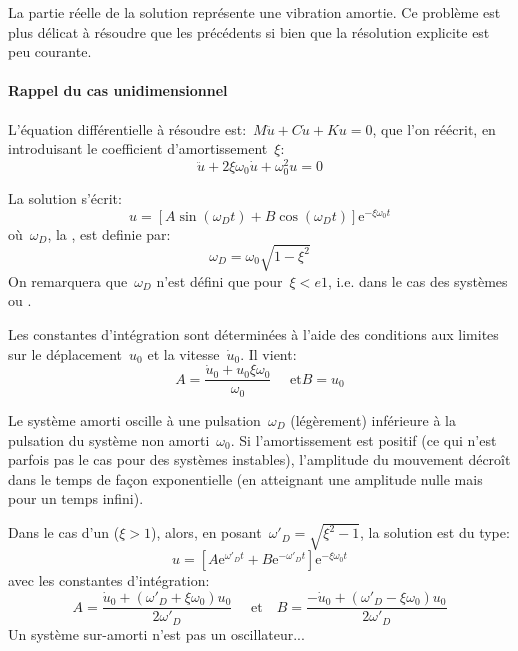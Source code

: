 La partie réelle de la solution représente une vibration amortie.
Ce problème est plus délicat à résoudre que les précédents si bien que la résolution
explicite est peu courante.

\medskip
{}
\paragraph{Rappel du cas unidimensionnel}
L'équation différentielle à résoudre est:~$M\ddot{u}+C\dot{u}+Ku=0$, que l'on
réécrit, en introduisant le coefficient d'amortissement~$\xi$:
\begin{equation}\ddot{u}+2\xi\omega_0\dot{u}+\omega^2_0 u=0\end{equation}

La solution s'écrit: \begin{equation} u=\left[A\sin (\omega_D t)+B\cos(\omega_D t)\right] \mathrm{e}^{-\xi\omega_0t} \end{equation}
où~$\omega_D$, la , est definie par:
\begin{equation}\omega_D=\omega_0\sqrt{1-\xi^2}\end{equation}
On remarquera que~$\omega_D$ n'est défini que pour~$\xi<e1$, i.e.
dans le cas des systèmes  ou .

Les constantes d'intégration sont déterminées à l'aide des conditions aux limites sur le déplacement~$u_0$ et la
vitesse~$\dot{u}_0$. Il vient: \begin{equation} A=\dfrac{\dot{u}_0+u_0\xi\omega_0}{\omega_0} \quad \text{ et} B=u_0\end{equation}

Le système amorti oscille à une pulsation~$\omega_D$ (légèrement) inférieure à la pulsation du
système non amorti~$\omega_0$. Si l'amortissement est positif (ce qui n’est parfois pas le cas
pour des systèmes instables), l'amplitude du mouvement décroît dans le temps de façon
exponentielle (en atteignant une amplitude nulle mais pour un temps infini).

\medskip
Dans le cas d'un  ($\xi>1$), alors, en posant~$\omega'_D=\sqrt{\xi^2-1}$, la solution est du type:
\begin{equation} u=\left[A\mathrm{e}^{\omega'_D t}+B\mathrm{e}^{-\omega'_D t}\right] \mathrm{e}^{-\xi\omega_0t} \end{equation}
avec les constantes d'intégration:
\begin{equation}A=\dfrac{\dot{u}_0+(\omega'_D+\xi\omega_0)u_0}{2\omega'_D} \quad \text{ et}\quad
B=\dfrac{-\dot{u}_0+(\omega'_D-\xi\omega_0)u_0}{2\omega'_D} \end{equation}
Un système sur-amorti n'est pas un oscillateur...

